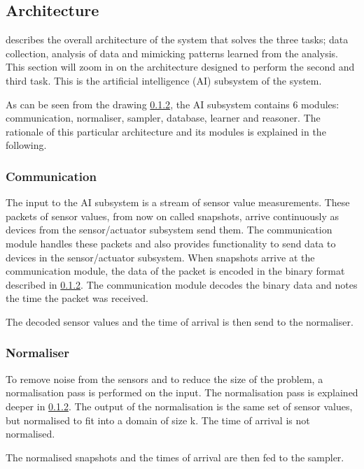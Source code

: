 \subsection{Architecture}

 describes the overall architecture of the system that solves the three tasks; data collection, analysis of data and mimicking patterns learned from the analysis. This section will zoom in on the architecture designed to perform the second and third task. This is the artificial intelligence (AI) subsystem of the system.


As can be seen from the drawing \cref{}, the AI subsystem contains 6 modules: communication, normaliser, sampler, database, learner and reasoner. The rationale of this particular architecture and its modules is explained in the following.

\subsubsection{Communication}
The input to the AI subsystem is a stream of sensor value measurements. These packets of sensor values, from now on called snapshots, arrive continuously as devices from the sensor/actuator subsystem send them. The communication module handles these packets and also provides functionality to send data to devices in the sensor/actuator subsystem. When snapshots arrive at the communication module, the data of the packet is encoded in the binary format described in \cref{}. The communication module decodes the binary data and notes the time the packet was received.

The decoded sensor values and the time of arrival is then send to the normaliser.

\subsubsection{Normaliser}
To remove noise from the sensors and to reduce the size of the problem, a normalisation pass is performed on the input. The normalisation pass is explained deeper in \cref{}. The output of the normalisation is the same set of sensor values, but normalised to fit into a domain of size k. The time of arrival is not normalised.

The normalised snapshots and the times of arrival are then fed to the sampler.

